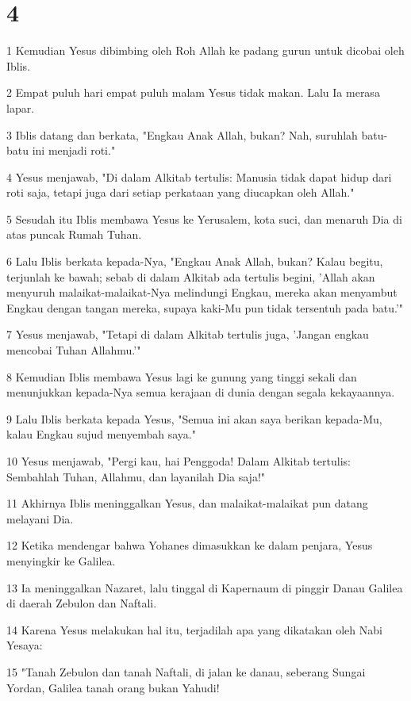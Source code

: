 \chapter{4}

\par 1 Kemudian Yesus dibimbing oleh Roh Allah ke padang gurun untuk dicobai oleh Iblis.
\par 2 Empat puluh hari empat puluh malam Yesus tidak makan. Lalu Ia merasa lapar.
\par 3 Iblis datang dan berkata, "Engkau Anak Allah, bukan? Nah, suruhlah batu-batu ini menjadi roti."
\par 4 Yesus menjawab, "Di dalam Alkitab tertulis: Manusia tidak dapat hidup dari roti saja, tetapi juga dari setiap perkataan yang diucapkan oleh Allah."
\par 5 Sesudah itu Iblis membawa Yesus ke Yerusalem, kota suci, dan menaruh Dia di atas puncak Rumah Tuhan.
\par 6 Lalu Iblis berkata kepada-Nya, "Engkau Anak Allah, bukan? Kalau begitu, terjunlah ke bawah; sebab di dalam Alkitab ada tertulis begini, 'Allah akan menyuruh malaikat-malaikat-Nya melindungi Engkau, mereka akan menyambut Engkau dengan tangan mereka, supaya kaki-Mu pun tidak tersentuh pada batu.'"
\par 7 Yesus menjawab, "Tetapi di dalam Alkitab tertulis juga, 'Jangan engkau mencobai Tuhan Allahmu.'"
\par 8 Kemudian Iblis membawa Yesus lagi ke gunung yang tinggi sekali dan menunjukkan kepada-Nya semua kerajaan di dunia dengan segala kekayaannya.
\par 9 Lalu Iblis berkata kepada Yesus, "Semua ini akan saya berikan kepada-Mu, kalau Engkau sujud menyembah saya."
\par 10 Yesus menjawab, "Pergi kau, hai Penggoda! Dalam Alkitab tertulis: Sembahlah Tuhan, Allahmu, dan layanilah Dia saja!"
\par 11 Akhirnya Iblis meninggalkan Yesus, dan malaikat-malaikat pun datang melayani Dia.
\par 12 Ketika mendengar bahwa Yohanes dimasukkan ke dalam penjara, Yesus menyingkir ke Galilea.
\par 13 Ia meninggalkan Nazaret, lalu tinggal di Kapernaum di pinggir Danau Galilea di daerah Zebulon dan Naftali.
\par 14 Karena Yesus melakukan hal itu, terjadilah apa yang dikatakan oleh Nabi Yesaya:
\par 15 "Tanah Zebulon dan tanah Naftali, di jalan ke danau, seberang Sungai Yordan, Galilea tanah orang bukan Yahudi!
